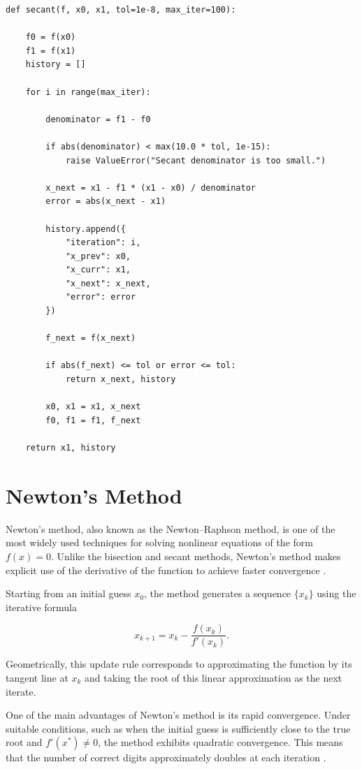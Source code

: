 \begin{lstlisting}
def secant(f, x0, x1, tol=1e-8, max_iter=100):

    f0 = f(x0)
    f1 = f(x1)
    history = []

    for i in range(max_iter):

        denominator = f1 - f0

        if abs(denominator) < max(10.0 * tol, 1e-15):
            raise ValueError("Secant denominator is too small.")

        x_next = x1 - f1 * (x1 - x0) / denominator
        error = abs(x_next - x1)

        history.append({
            "iteration": i,
            "x_prev": x0,
            "x_curr": x1,
            "x_next": x_next,
            "error": error
        })

        f_next = f(x_next)

        if abs(f_next) <= tol or error <= tol:
            return x_next, history

        x0, x1 = x1, x_next
        f0, f1 = f1, f_next

    return x1, history
\end{lstlisting}

\section{Newton's Method}

Newton's method, also known as the Newton–Raphson method, is one of the most widely used techniques for solving nonlinear equations of the form \( f(x) = 0 \). Unlike the bisection and secant methods, Newton's method makes explicit use of the derivative of the function to achieve faster convergence \cite{burden, atkinson, kelley}.

Starting from an initial guess \( x_0 \), the method generates a sequence \( \{x_k\} \) using the iterative formula

\begin{equation}
x_{k+1} = x_k - \frac{f(x_k)}{f'(x_k)}.
\end{equation}

Geometrically, this update rule corresponds to approximating the function by its tangent line at \( x_k \) and taking the root of this linear approximation as the next iterate.

One of the main advantages of Newton's method is its rapid convergence. Under suitable conditions, such as when the initial guess is sufficiently close to the true root and \( f'(x^*) \neq 0 \), the method exhibits quadratic convergence. This means that the number of correct digits approximately doubles at each iteration \cite{burden}.


